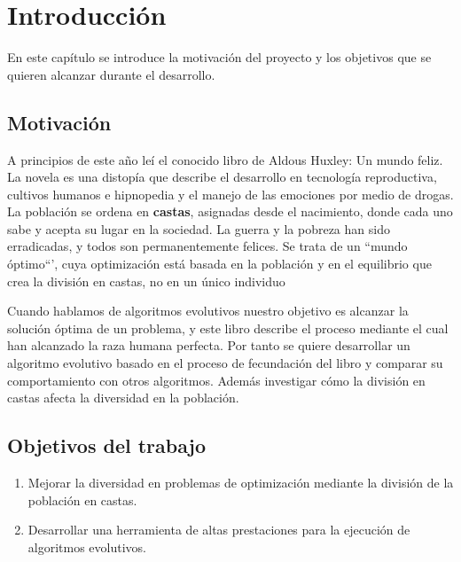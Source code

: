 \chapter{Introducción}

En este capítulo se introduce la motivación del proyecto y los objetivos que se quieren alcanzar durante el desarrollo. 

\section{Motivación}

A principios de este año leí el conocido libro de Aldous Huxley: Un mundo feliz. La novela es una
distopía que describe el desarrollo en tecnología reproductiva, cultivos humanos e hipnopedia y el manejo de las
emociones por medio de drogas. La población se ordena en \textbf{castas}, asignadas desde el nacimiento, donde cada uno
sabe y acepta su lugar en la sociedad. La guerra y la pobreza han sido erradicadas, y todos son permanentemente
felices. Se trata de un ``mundo óptimo``', cuya optimización está basada en la población y en el equilibrio que crea
la división en castas, no en un único individuo 

Cuando hablamos de algoritmos evolutivos nuestro objetivo es alcanzar la solución óptima de un problema, y este libro describe el 
proceso mediante el cual han alcanzado la raza humana perfecta. Por tanto se quiere desarrollar un algoritmo evolutivo basado en 
el proceso de fecundación del libro y comparar su comportamiento con otros algoritmos. Además investigar cómo la división en castas afecta 
la diversidad en la población.

\section{Objetivos del trabajo}

\begin{enumerate}
    \item Mejorar la diversidad en problemas de optimización mediante la división de la población en castas.
    \item Desarrollar una herramienta de altas prestaciones para la ejecución de algoritmos evolutivos.
\end{enumerate}